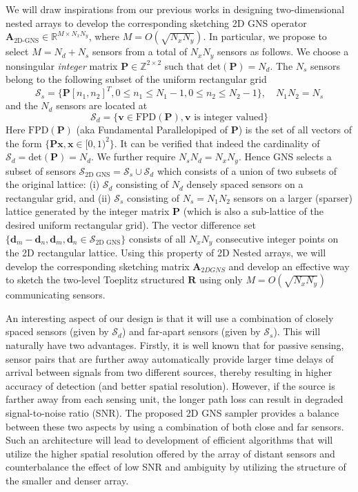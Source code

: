  We will draw inspirations from our previous works in designing two-dimensional nested arrays to develop the corresponding sketching 2D GNS operator $\mathbf{A}_{\text{2D-GNS}} \in \mathbb{R}^{M \times {N_xN_y}}$, where $M = O(\sqrt{N_xN_y})$. In particular, we propose to select $M=N_d+N_s$ sensors from a total of $N_xN_y$ sensors as follows. We choose a nonsingular {\em integer} matrix $\mathbf{P}\in \mathbb{Z}^{2\times 2}$ such that $\text{det}(\mathbf{P})=N_d$. The $N_s$ sensors belong to the following subset  of the uniform rectangular grid \[ \mathcal{S}_{s} = \{\mathbf{P}[n_1,n_2]^{T}, 0\leq n_1\leq N_1-1, 0\leq n_2\leq N_2-1 \} ,\quad N_1N_2 = N_s \]
and the $N_d$ sensors are located at \[ \mathcal{S}_d = \{ \mathbf{v} \in \text{FPD}(\mathbf{P}), \mathbf{v} \text{ is integer valued} \} \] 
%
Here $\text{FPD}(\mathbf{P})$ (aka Fundamental Parallelopiped of $\mathbf{P}$)  is the set of all vectors of the form $\{\mathbf{Px}, \mathbf{x}\in[0,1)^2 \}$. It can be verified that indeed the cardinality of $\mathcal{S}_d = \text{det}(\mathbf{P}) = N_d$. We further require $N_sN_d = N_xN_y$. Hence GNS selects a subset of sensors $\mathcal{S}_{\text{2D GNS}} = \mathcal{S}_s\cup \mathcal{S}_d$ which consists of a union of two subsets of the original lattice: (i) $\mathcal{S}_d$ consisting of $N_d$ densely spaced sensors on a rectangular grid, and (ii) $\mathcal{S}_s$ consisting of $N_s = N_1N_2$ sensors on a larger (sparser) lattice generated by the integer matrix $\mathbf{P}$ (which is also a sub-lattice of the desired uniform rectangular grid). The vector difference set $\{\mathbf{d}_m-\mathbf{d}_n, \mathbf{d}_m,\mathbf{d}_n\in \mathcal{S}_{\text{2D GNS}}\}$ consists of all $N_xN_y$ consecutive integer points on the 2D rectangular lattice. Using this property of 2D Nested arrays, we will develop the corresponding sketching matrix $\mathbf{A}_{2D GNS}$ and develop an effective way to sketch the two-level Toeplitz structured $\mathbf{R}$ using only $M = O(\sqrt{N_xN_y})$ communicating sensors. 

An interesting aspect of our design is that it will use a combination of closely spaced sensors (given by $\mathcal{S}_d$) and far-apart sensors (given by $\mathcal{S}_s$). This will naturally have two advantages. 
Firstly,  it is well known that for passive sensing, sensor pairs that are further away automatically provide larger time delays of arrival between signals from two different sources, thereby resulting in higher accuracy of detection (and better spatial resolution). However, if the source is farther away from each sensing unit, the longer path loss can result in degraded signal-to-noise ratio (SNR). The proposed 2D GNS sampler provides a balance between these two aspects by using a combination of both close and far sensors. Such an architecture will lead to development of efficient algorithms that will utilize the higher spatial resolution offered by the array of distant sensors and counterbalance the effect of low SNR and ambiguity by utilizing the structure of the smaller and denser array. 

